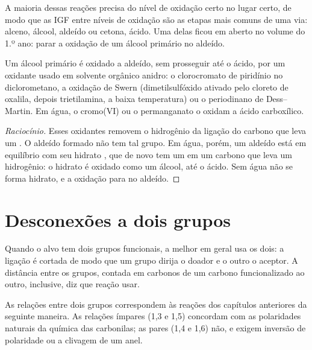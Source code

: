 A maioria dessas reações precisa do nível de oxidação certo no lugar certo, de modo que as IGF entre
níveis de oxidação são as etapas mais comuns de uma via: alceno, álcool, aldeído ou cetona, ácido. Uma
delas ficou em aberto no volume do 1.º ano: parar a oxidação de um álcool primário no aldeído.

\begin{proposition}\label{prop:b2:retrosynthesis:mild-oxidation}
Um álcool primário é oxidado a aldeído, sem prosseguir até o ácido, por um oxidante usado em solvente
orgânico anidro: o clorocromato de piridínio no diclorometano, a oxidação de Swern (dimetilsulfóxido
ativado pelo cloreto de oxalila, depois trietilamina, a baixa temperatura) ou o periodinano de
Dess--Martin. Em água, o cromo(VI) ou o permanganato o oxidam a ácido carboxílico.
\end{proposition}

\begin{proof}[Raciocínio]
Esses oxidantes removem o hidrogênio da ligação  do carbono que leva um . O aldeído
formado não tem tal grupo. Em água, porém, um aldeído está em equilíbrio com seu hidrato
, que de novo tem um  em um carbono que leva um hidrogênio: o hidrato é oxidado
como um álcool, até o ácido. Sem água não se forma hidrato, e a oxidação para no
aldeído.
\end{proof}

\section{Desconexões a dois grupos}

Quando o alvo tem dois grupos funcionais, a melhor  em geral usa os dois: a ligação é cortada
de modo que um grupo dirija o doador e o outro o aceptor. A distância entre os grupos, contada em
carbonos de um carbono funcionalizado ao outro, inclusive, diz que reação usar.

\begin{proposition}\label{prop:b2:retrosynthesis:patterns}
As relações entre dois grupos correspondem às reações dos capítulos anteriores da seguinte maneira. As
relações ímpares (1,3 e 1,5) concordam com as polaridades naturais da química das carbonilas; as pares
(1,4 e 1,6) não, e exigem inversão de polaridade ou a clivagem de um anel.
\end{proposition}


